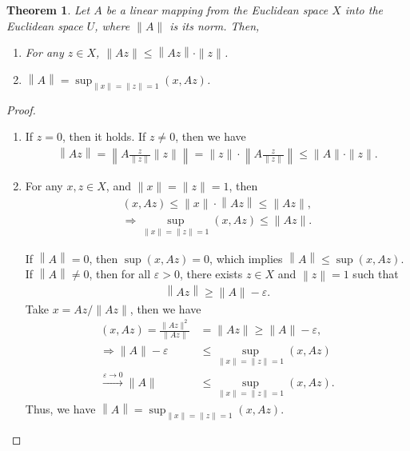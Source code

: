 \documentclass[11pt]{book}
\newtheorem{theorem}{Theorem}[chapter]
\theoremstyle{definition}
\numberwithin{equation}{chapter}
\begin{document}
\begin{theorem}
Let $A$ be a linear mapping from the Euclidean space $X$ into the
Euclidean space $U$, where $\|A\|$ is its norm. Then, 
\begin{enumerate}[label=(\alph*)]
    \item For any $z\in X$, $\|Az\|\leq \left\|Az\right\|\cdot \|z\|$.
    \item $\left\|A\right\| = \sup_{\|x\| = \|z\| = 1} (x, Az)$.
\end{enumerate}
\end{theorem}
\begin{proof}
~\begin{enumerate}[label=(\alph*)]
    \item If $z = 0$, then it holds. If $z\neq 0$, then we have 
    \begin{align*}
        \left\|Az\right\| = \left\|A \frac{z}{\|z\|}\|z\|\right\| = \|z\|\cdot \left\|A \frac{z}{\|z\|}\right\| \leq \|A\|\cdot \|z\|.
    \end{align*}
    \item For any $x,z\in X$, and $\|x\| = \|z\| = 1$, then 
    \begin{align*}
        (x, Az) \leq \|x\| \cdot \left\|Az\right\| \leq \|Az\|, \\
        \Rightarrow \sup_{\|x\| = \|z\| = 1} (x, Az) \leq \|Az\|.
    \end{align*}
    
    If $\left\|A\right\| = 0$, then $\sup (x, Az) = 0$, which implies $\left\|A\right\| \leq \sup (x, Az)$. If $\left\|A\right\| \neq 0$, then for all $\varepsilon > 0$, there exists $z \in X$ and $\left\|z\right\| = 1$ such that 
    \begin{align*}
        \left\|Az\right\| \geq \|A\| - \varepsilon.
    \end{align*}
    Take $x = Az/ \|Az\|$, then we have 
    \begin{align*}
        (x, Az) = \frac{\|Az\|^2}{\|Az\|} & = \|Az\| \geq \|A\| - \varepsilon, \\
        \Rightarrow \|A\| - \varepsilon & \leq \sup_{\|x\| = \|z\| = 1} (x, Az) \\
        \xrightarrow{\varepsilon \to 0} \|A\| & \leq \sup_{\|x\| = \|z\| = 1} (x, Az).
    \end{align*}
    Thus, we have $\left\|A\right\| = \sup_{\|x\| = \|z\| = 1} (x, Az)$.
\end{enumerate}
\end{proof}
\end{document}
